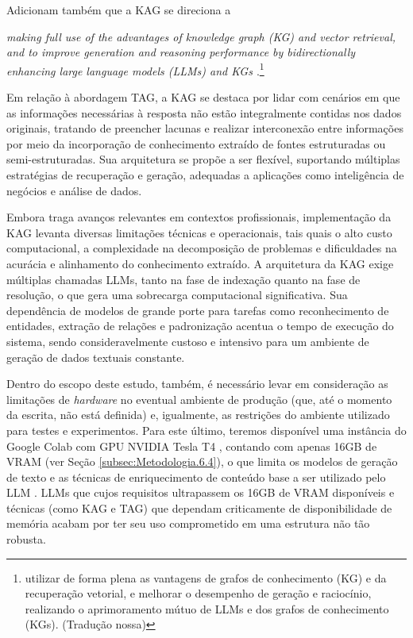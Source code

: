 Adicionam também que a \ac{KAG} se direciona a 
\begin{citacao}
    \textit{making full use of the advantages of knowledge graph (KG) and vector retrieval, and to improve generation and reasoning performance by bidirectionally enhancing large language models (LLMs) and KGs \cite{KAG:1}}.\footnote{utilizar de forma plena as vantagens de grafos de conhecimento (KG) e da recuperação vetorial, e melhorar o desempenho de geração e raciocínio, realizando o aprimoramento mútuo de \ac{LLM}s e dos grafos de conhecimento (KGs). (Tradução nossa)}
\end{citacao}

Em relação à abordagem \ac{TAG}, a \ac{KAG} se destaca por lidar com cenários em que as informações necessárias à resposta não estão integralmente contidas nos dados originais, tratando de preencher lacunas e realizar interconexão entre informações por meio da incorporação de conhecimento extraído de fontes estruturadas ou semi-estruturadas. Sua arquitetura se propõe a ser flexível, suportando múltiplas estratégias de recuperação e geração, adequadas a aplicações como inteligência de negócios e análise de dados. 

Embora traga avanços relevantes em contextos profissionais, implementação da \ac{KAG} levanta diversas limitações técnicas e operacionais, tais quais o alto custo computacional, a complexidade na decomposição de problemas e dificuldades na acurácia e alinhamento do conhecimento extraído. A arquitetura da \ac{KAG} exige múltiplas chamadas \ac{LLM}s, tanto na fase de indexação quanto na fase de resolução, o que gera uma sobrecarga computacional significativa. Sua dependência de modelos de grande porte para tarefas como reconhecimento de entidades, extração de relações e padronização acentua o tempo de execução do sistema, sendo consideravelmente custoso e intensivo para um ambiente de geração de dados textuais constante.

Dentro do escopo deste estudo, também, é necessário levar em consideração as limitações de \textit{hardware} no eventual ambiente de produção (que, até o momento da escrita, não está definida) e, igualmente, as restrições do ambiente utilizado para testes e experimentos. Para este último, teremos disponível uma instância do Google Colab com GPU NVIDIA Tesla T4 \cite{HARDWARE:1, HARDWARE:2}, contando com apenas 16GB de VRAM (ver Seção \ref{subsec:Metodologia.6.4}), o que limita os modelos de geração de texto e as técnicas de enriquecimento de conteúdo base a ser utilizado pelo \ac{LLM} \cite{REQUISITOS:1, REQUISITOS:2, REQUISITOS:3}. \ac{LLM}s que cujos requisitos ultrapassem os 16GB de VRAM disponíveis e técnicas (como  \ac{KAG} e \ac{TAG}) que dependam criticamente de disponibilidade de memória acabam por ter seu uso comprometido em uma estrutura não tão robusta.

